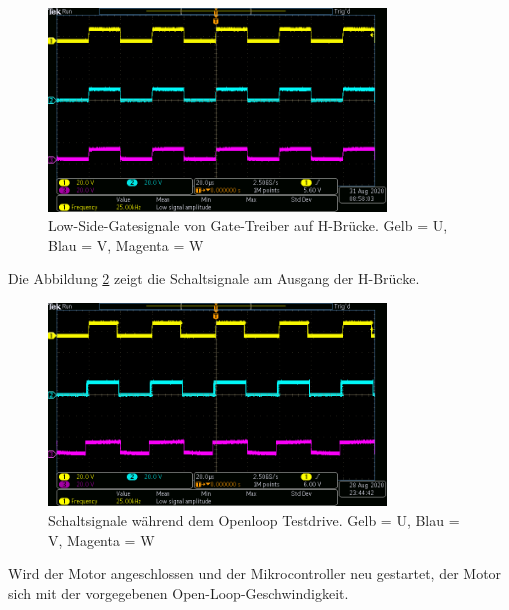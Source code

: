 \begin{figure}[H]
\center
\includegraphics[width = 0.8\textwidth]{graphics/TMC6200_Gate_Signal_L}
\caption{Low-Side-Gatesignale von Gate-Treiber auf H-Brücke. Gelb = U, Blau = V, Magenta = W}
\label{fig:TMC6200_Gate_Signal_L}
\end{figure}
\newpage
Die Abbildung \ref{fig:OpenLoop_TestDrive2} zeigt die Schaltsignale am Ausgang der H-Brücke.

\begin{figure}[H]
	\centering
	\includegraphics[width=0.8\textwidth]{graphics/OpenLoop_TestDrive2}
	\caption{Schaltsignale während dem Openloop Testdrive. Gelb = U, Blau = V, Magenta = W}
	\label{fig:OpenLoop_TestDrive2}
\end{figure}

Wird der Motor angeschlossen und der Mikrocontroller neu gestartet, der Motor sich mit der vorgegebenen Open-Loop-Geschwindigkeit.